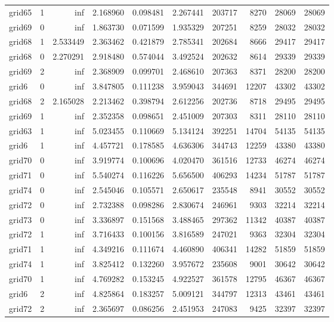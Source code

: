 \begin{longtable}{|l|r|r|r|r|r|r|r|r|r|}
grid65 & 1 & inf & 2.168960 & 0.098481 & 2.267441 & 203717 & 8270 & 28069 & 28069 \\
grid69 & 0 & inf & 1.863730 & 0.071599 & 1.935329 & 207251 & 8259 & 28032 & 28032 \\
grid68 & 1 & 2.533449 & 2.363462 & 0.421879 & 2.785341 & 202684 & 8666 & 29417 & 29417 \\
grid68 & 0 & 2.270291 & 2.918480 & 0.574044 & 3.492524 & 202632 & 8614 & 29339 & 29339 \\
grid69 & 2 & inf & 2.368909 & 0.099701 & 2.468610 & 207363 & 8371 & 28200 & 28200 \\
grid6 & 0 & inf & 3.847805 & 0.111238 & 3.959043 & 344691 & 12207 & 43302 & 43302 \\
grid68 & 2 & 2.165028 & 2.213462 & 0.398794 & 2.612256 & 202736 & 8718 & 29495 & 29495 \\
grid69 & 1 & inf & 2.352358 & 0.098651 & 2.451009 & 207303 & 8311 & 28110 & 28110 \\
grid63 & 1 & inf & 5.023455 & 0.110669 & 5.134124 & 392251 & 14704 & 54135 & 54135 \\
grid6 & 1 & inf & 4.457721 & 0.178585 & 4.636306 & 344743 & 12259 & 43380 & 43380 \\
grid70 & 0 & inf & 3.919774 & 0.100696 & 4.020470 & 361516 & 12733 & 46274 & 46274 \\
grid71 & 0 & inf & 5.540274 & 0.116226 & 5.656500 & 406293 & 14234 & 51787 & 51787 \\
grid74 & 0 & inf & 2.545046 & 0.105571 & 2.650617 & 235548 & 8941 & 30552 & 30552 \\
grid72 & 0 & inf & 2.732388 & 0.098286 & 2.830674 & 246961 & 9303 & 32214 & 32214 \\
grid73 & 0 & inf & 3.336897 & 0.151568 & 3.488465 & 297362 & 11342 & 40387 & 40387 \\
grid72 & 1 & inf & 3.716433 & 0.100156 & 3.816589 & 247021 & 9363 & 32304 & 32304 \\
grid71 & 1 & inf & 4.349216 & 0.111674 & 4.460890 & 406341 & 14282 & 51859 & 51859 \\
grid74 & 1 & inf & 3.825412 & 0.132260 & 3.957672 & 235608 & 9001 & 30642 & 30642 \\
grid70 & 1 & inf & 4.769282 & 0.153245 & 4.922527 & 361578 & 12795 & 46367 & 46367 \\
grid6 & 2 & inf & 4.825864 & 0.183257 & 5.009121 & 344797 & 12313 & 43461 & 43461 \\
grid72 & 2 & inf & 2.365697 & 0.086256 & 2.451953 & 247083 & 9425 & 32397 & 32397 \\

\end{longtable}
